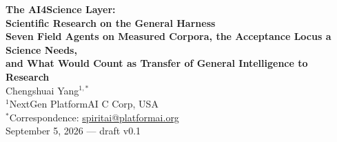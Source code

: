 
\begin{center}
{\LARGE\bfseries The AI4Science Layer:}\\[4pt]
{\LARGE\bfseries Scientific Research on the General Harness}\\[8pt]
{\large\bfseries Seven Field Agents on Measured Corpora, the Acceptance Locus a Science Needs,\\[2pt]
and What Would Count as Transfer of General Intelligence to Research}\\[16pt]
{\large Chengshuai Yang$^{1,*}$}\\[5pt]
{\normalsize $^{1}$NextGen PlatformAI C Corp, USA}\\[4pt]
{\normalsize $^{*}$Correspondence: \href{mailto:spiritai@platformai.org}{spiritai@platformai.org}}\\[10pt]
{\small September 5, 2026 --- draft v0.1}
\end{center}


